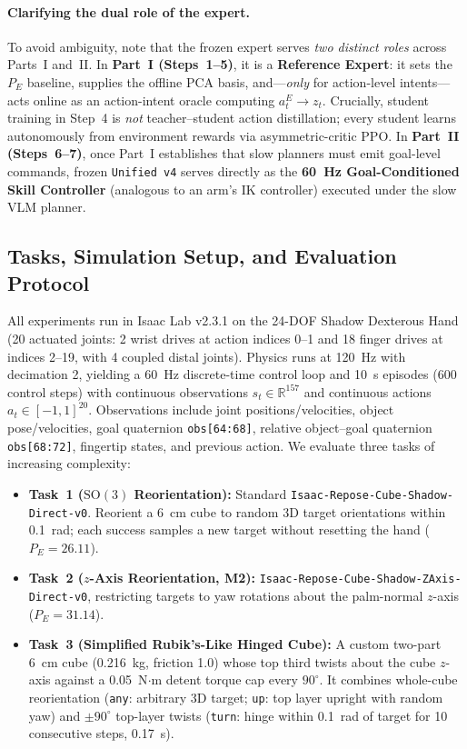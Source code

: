 \paragraph{Clarifying the dual role of the expert.}
To avoid ambiguity, note that the frozen expert serves \emph{two distinct roles} across Parts~I and~II.
In \textbf{Part~I (Steps~1--5)}, it is a \textbf{Reference Expert}: it sets the $P_E$ baseline, supplies the offline PCA basis, and—\emph{only} for action-level intents—acts online as an action-intent oracle computing $a_t^E \to z_t$.
Crucially, student training in Step~4 is \emph{not} teacher--student action distillation; every student learns autonomously from environment rewards via asymmetric-critic PPO.
In \textbf{Part~II (Steps~6--7)}, once Part~I establishes that slow planners must emit goal-level commands, frozen \texttt{Unified v4} serves directly as the \textbf{60~Hz Goal-Conditioned Skill Controller} (analogous to an arm's IK controller) executed under the slow VLM planner.

\subsection{Tasks, Simulation Setup, and Evaluation Protocol}
\label{sec:method_tasks}
All experiments run in Isaac Lab v2.3.1 \citep{mittal2023orbit} on the 24-DOF Shadow Dexterous Hand (20 actuated joints: 2 wrist drives at action indices 0--1 and 18 finger drives at indices 2--19, with 4 coupled distal joints).
Physics runs at 120~Hz with decimation 2, yielding a 60~Hz discrete-time control loop and 10~s episodes (600 control steps) with continuous observations $s_t \in \mathbb{R}^{157}$ and continuous actions $a_t \in [-1,1]^{20}$.
Observations include joint positions/velocities, object pose/velocities, goal quaternion \texttt{obs[64:68]}, relative object--goal quaternion \texttt{obs[68:72]}, fingertip states, and previous action.
We evaluate three tasks of increasing complexity:
\begin{itemize}[leftmargin=1.5em,itemsep=1.5pt,topsep=2pt]
  \item \textbf{Task~1 ($\mathrm{SO}(3)$ Reorientation):} Standard \texttt{Isaac-Repose-Cube-Shadow-Direct-v0}. Reorient a 6~cm cube to random 3D target orientations within 0.1~rad; each success samples a new target without resetting the hand ($P_E=26.11$).
  \item \textbf{Task~2 ($z$-Axis Reorientation, M2):} \texttt{Isaac-Repose-Cube-Shadow-ZAxis-Direct-v0}, restricting targets to yaw rotations about the palm-normal $z$-axis ($P_E=31.14$).
  \item \textbf{Task~3 (Simplified Rubik's-Like Hinged Cube):} A custom two-part 6~cm cube (0.216~kg, friction 1.0) whose top third twists about the cube $z$-axis against a 0.05~N$\cdot$m detent torque cap every $90^\circ$. It combines whole-cube reorientation (\texttt{any}: arbitrary 3D target; \texttt{up}: top layer upright with random yaw) and $\pm 90^\circ$ top-layer twists (\texttt{turn}: hinge within 0.1~rad of target for 10 consecutive steps, 0.17~s).
\end{itemize}

